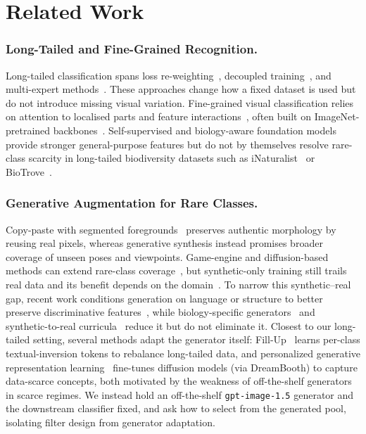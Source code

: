 \documentclass[runningheads]{llncs}
\begin{document}
\section{Related Work}
\label{sec:related}

\subsubsection{Long-Tailed and Fine-Grained Recognition.}
Long-tailed classification spans loss
re-weighting~\cite{cui_class-balanced_2019, lin_focal_2018,
cao_learning_2019}, decoupled training~\cite{kang_decoupling_2020}, and
multi-expert methods~\cite{wang_long-tailed_2022}. These approaches
change how a fixed dataset is used but do not introduce missing visual
variation. Fine-grained visual classification relies on attention to
localised parts and feature interactions~\cite{lin_bilinear_2018,
zheng_learning_2017, wei_fine-grained_2021}, often built on
ImageNet-pretrained backbones~\cite{he_deep_2015,
kornblith_better_2019}. Self-supervised and biology-aware foundation
models~\cite{oquab_dinov2_2024, radford_learning_2021,
stevens_bioclip_2024} provide stronger general-purpose features but do
not by themselves resolve rare-class scarcity in long-tailed
biodiversity datasets such as iNaturalist~\cite{horn_inaturalist_2018}
or BioTrove~\cite{yang_biotrove_2024}.

\subsubsection{Generative Augmentation for Rare Classes.}
Copy-paste with segmented foregrounds~\cite{ghiasi_simple_2021}
preserves authentic morphology by reusing real pixels, whereas
generative synthesis instead promises broader coverage of unseen poses
and viewpoints. Game-engine and diffusion-based methods can extend
rare-class coverage~\cite{beery_synthetic_2020, azizi_synthetic_2023},
but synthetic-only training still trails real data and its benefit
depends on the domain~\cite{he_is_2023}. To narrow this synthetic--real
gap, recent work conditions generation on language or structure to
better preserve discriminative features~\cite{michaeli_advancing_2025,
zhao_ltgc_2024}, while biology-specific
generators~\cite{monsefi_taxadiffusion_2025} and synthetic-to-real
curricula~\cite{liang_diffusion_2025} reduce it but do not eliminate it.
Closest to our long-tailed setting, several methods adapt the generator itself: Fill-Up~\cite{shin_fill-up_2023} learns
per-class textual-inversion tokens to rebalance long-tailed data, and
personalized generative representation
learning~\cite{sundaram_personalized_2024} fine-tunes diffusion models
(\eg via DreamBooth) to capture data-scarce concepts, both motivated by
the weakness of off-the-shelf generators in scarce regimes. We instead
hold an off-the-shelf \texttt{gpt-image-1.5} generator and the
downstream classifier fixed, and ask how to select from the
generated pool, isolating filter design from generator adaptation.
\end{document}
